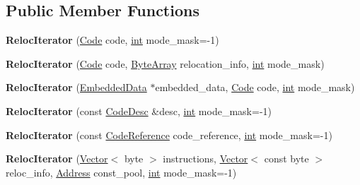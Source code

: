 \subsection*{Public Member Functions}
\begin{DoxyCompactItemize}
\item 
\mbox{\label{classv8_1_1internal_1_1RelocIterator_aede3cf32817c051a3e14b6ae9a40f68e}} 
{\bfseries Reloc\+Iterator} (\mbox{\hyperlink{classv8_1_1internal_1_1Code}{Code}} code, \mbox{\hyperlink{classint}{int}} mode\+\_\+mask=-\/1)
\item 
\mbox{\label{classv8_1_1internal_1_1RelocIterator_a154b022e1f9b77ac6559ff8f0ae77f99}} 
{\bfseries Reloc\+Iterator} (\mbox{\hyperlink{classv8_1_1internal_1_1Code}{Code}} code, \mbox{\hyperlink{classv8_1_1internal_1_1ByteArray}{Byte\+Array}} relocation\+\_\+info, \mbox{\hyperlink{classint}{int}} mode\+\_\+mask)
\item 
\mbox{\label{classv8_1_1internal_1_1RelocIterator_aebca7fa77f505b79438d6f278a2432ee}} 
{\bfseries Reloc\+Iterator} (\mbox{\hyperlink{classv8_1_1internal_1_1EmbeddedData}{Embedded\+Data}} $\ast$embedded\+\_\+data, \mbox{\hyperlink{classv8_1_1internal_1_1Code}{Code}} code, \mbox{\hyperlink{classint}{int}} mode\+\_\+mask)
\item 
\mbox{\label{classv8_1_1internal_1_1RelocIterator_a861840bc6a67d6ca50beea9638133f70}} 
{\bfseries Reloc\+Iterator} (const \mbox{\hyperlink{structv8_1_1internal_1_1CodeDesc}{Code\+Desc}} \&desc, \mbox{\hyperlink{classint}{int}} mode\+\_\+mask=-\/1)
\item 
\mbox{\label{classv8_1_1internal_1_1RelocIterator_a096bbafb9e45e9a66105bebd99f87ff7}} 
{\bfseries Reloc\+Iterator} (const \mbox{\hyperlink{classv8_1_1internal_1_1CodeReference}{Code\+Reference}} code\+\_\+reference, \mbox{\hyperlink{classint}{int}} mode\+\_\+mask=-\/1)
\item 
\mbox{\label{classv8_1_1internal_1_1RelocIterator_aab690cf10f1d4958e626500ae21b6f54}} 
{\bfseries Reloc\+Iterator} (\mbox{\hyperlink{classv8_1_1internal_1_1Vector}{Vector}}$<$ byte $>$ instructions, \mbox{\hyperlink{classv8_1_1internal_1_1Vector}{Vector}}$<$ const byte $>$ reloc\+\_\+info, \mbox{\hyperlink{classuintptr__t}{Address}} const\+\_\+pool, \mbox{\hyperlink{classint}{int}} mode\+\_\+mask=-\/1)

\end{DoxyCompactItemize}
